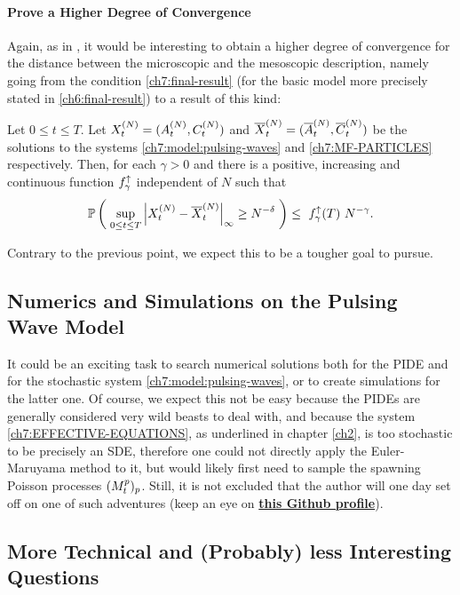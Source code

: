 	\paragraph{Prove a Higher Degree of Convergence}
	Again, as in \cite{ana}, it would be interesting to obtain a higher degree of convergence for the distance between the microscopic and the mesoscopic description, namely going from the condition \ref{ch7:final-result} (for the basic model more precisely stated in \ref{ch6:final-result}) to a result of this kind:
	\begin{proposition}\label{conc:final-result-with-higher-convergence}
		Let $0\leq t \leq T$.
		Let $X_t^{(N)} = (A_t^{(N)}, C_t^{(N)})$ and $\overline{X}_t^{(N)}= (\overline{A}_t^{(N)}, \overline{C}_t^{(N)})$ be the solutions to the systems \ref{ch7:model:pulsing-waves} and \ref{ch7:MF-PARTICLES} respectively.
		Then, for each $\gamma>0$ and there is a positive, increasing and continuous function $f^\uparrow_\gamma$ independent of $N$ such that
		\begin{equation}
			\mathbb{P} \left( \; 
				\sup_{0 \leq t \leq T}
				{ \left| 
					X_t^{(N)} - \overline{X}_t^{(N)}
				 \right|_{\infty} } 
				\geq
				N^{-\delta}
			 \; \right)
			\leq\
			f^\uparrow_{\gamma}(T)\
			N^{-\gamma}.
		\end{equation}
	\end{proposition}
	Contrary to the previous point, we expect this to be a tougher goal to pursue.
	
\subsection{Numerics and Simulations on the Pulsing Wave Model}
It could be an exciting task to search numerical solutions both for the PIDE and for the stochastic system \ref{ch7:model:pulsing-waves}, or to create simulations for the latter one.
Of course, we expect this not be easy because the PIDEs are generally considered very wild beasts to deal with, and because the system \ref{ch7:EFFECTIVE-EQUATIONS}, as underlined in chapter \ref{ch2}, is too stochastic to be precisely an SDE, therefore one could not directly apply the Euler-Maruyama method to it, but would likely first need to sample the spawning Poisson processes $(M_t^p)_p$.
Still, it is not excluded that the author will one day set off on one of such adventures (keep an eye on \textbf{\href{https://github.com/carlolalu}{this Github profile}}).

\subsection{More Technical and (Probably) less Interesting Questions}

